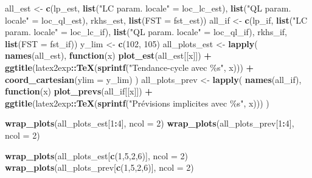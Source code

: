 \documentclass[
  12pt,
  a4paper,french]{article}
\newenvironment{Shaded}{\begin{snugshade}}{\end{snugshade}}
\newcommand{\AttributeTok}[1]{\textcolor[rgb]{0.13,0.29,0.53}{#1}}
\newcommand{\ControlFlowTok}[1]{\textcolor[rgb]{0.13,0.29,0.53}{\textbf{#1}}}
\newcommand{\DecValTok}[1]{\textcolor[rgb]{0.00,0.00,0.81}{#1}}
\newcommand{\FunctionTok}[1]{\textcolor[rgb]{0.13,0.29,0.53}{\textbf{#1}}}
\newcommand{\NormalTok}[1]{#1}
\newcommand{\OtherTok}[1]{\textcolor[rgb]{0.56,0.35,0.01}{#1}}
\newcommand{\SpecialCharTok}[1]{\textcolor[rgb]{0.81,0.36,0.00}{\textbf{#1}}}
\newcommand{\StringTok}[1]{\textcolor[rgb]{0.31,0.60,0.02}{#1}}
\newcommand\1{\mathds{1}}
\begin{document}
\begin{Shaded}
\begin{Highlighting}[]
\NormalTok{all\_est }\OtherTok{\textless{}{-}} \FunctionTok{c}\NormalTok{(lp\_est, }\FunctionTok{list}\NormalTok{(}\StringTok{"LC param. locale"} \OtherTok{=}\NormalTok{ loc\_lc\_est),}
             \FunctionTok{list}\NormalTok{(}\StringTok{"QL param. locale"} \OtherTok{=}\NormalTok{ loc\_ql\_est), }
\NormalTok{             rkhs\_est,}
             \FunctionTok{list}\NormalTok{(}\AttributeTok{FST =}\NormalTok{ fst\_est))}
\NormalTok{all\_if }\OtherTok{\textless{}{-}} \FunctionTok{c}\NormalTok{(lp\_if, }\FunctionTok{list}\NormalTok{(}\StringTok{"LC param. locale"} \OtherTok{=}\NormalTok{ loc\_lc\_if),}
            \FunctionTok{list}\NormalTok{(}\StringTok{"QL param. locale"} \OtherTok{=}\NormalTok{ loc\_ql\_if), }
\NormalTok{            rkhs\_if,}
            \FunctionTok{list}\NormalTok{(}\AttributeTok{FST =}\NormalTok{ fst\_if))}
\NormalTok{y\_lim }\OtherTok{\textless{}{-}} \FunctionTok{c}\NormalTok{(}\DecValTok{102}\NormalTok{, }\DecValTok{105}\NormalTok{)}
\NormalTok{all\_plots\_est }\OtherTok{\textless{}{-}} \FunctionTok{lapply}\NormalTok{(}
  \FunctionTok{names}\NormalTok{(all\_est), }
  \ControlFlowTok{function}\NormalTok{(x) }\FunctionTok{plot\_est}\NormalTok{(all\_est[[x]]) }\SpecialCharTok{+} 
    \FunctionTok{ggtitle}\NormalTok{(latex2exp}\SpecialCharTok{::}\FunctionTok{TeX}\NormalTok{(}\FunctionTok{sprintf}\NormalTok{(}\StringTok{"Tendance{-}cycle avec \%s"}\NormalTok{, x))) }\SpecialCharTok{+}
    \FunctionTok{coord\_cartesian}\NormalTok{(}\AttributeTok{ylim =}\NormalTok{ y\_lim)}
\NormalTok{)}
\NormalTok{all\_plots\_prev }\OtherTok{\textless{}{-}} \FunctionTok{lapply}\NormalTok{(}
  \FunctionTok{names}\NormalTok{(all\_if), }
  \ControlFlowTok{function}\NormalTok{(x) }\FunctionTok{plot\_prevs}\NormalTok{(all\_if[[x]]) }\SpecialCharTok{+} 
    \FunctionTok{ggtitle}\NormalTok{(latex2exp}\SpecialCharTok{::}\FunctionTok{TeX}\NormalTok{(}\FunctionTok{sprintf}\NormalTok{(}\StringTok{"Prévisions implicites avec \%s"}\NormalTok{, x)))}
\NormalTok{)}

\FunctionTok{wrap\_plots}\NormalTok{(all\_plots\_est[}\DecValTok{1}\SpecialCharTok{:}\DecValTok{4}\NormalTok{], }\AttributeTok{ncol =} \DecValTok{2}\NormalTok{)}
\FunctionTok{wrap\_plots}\NormalTok{(all\_plots\_prev[}\DecValTok{1}\SpecialCharTok{:}\DecValTok{4}\NormalTok{], }\AttributeTok{ncol =} \DecValTok{2}\NormalTok{)}

\FunctionTok{wrap\_plots}\NormalTok{(all\_plots\_est[}\FunctionTok{c}\NormalTok{(}\DecValTok{1}\NormalTok{,}\DecValTok{5}\NormalTok{,}\DecValTok{2}\NormalTok{,}\DecValTok{6}\NormalTok{)], }\AttributeTok{ncol =} \DecValTok{2}\NormalTok{)}
\FunctionTok{wrap\_plots}\NormalTok{(all\_plots\_prev[}\FunctionTok{c}\NormalTok{(}\DecValTok{1}\NormalTok{,}\DecValTok{5}\NormalTok{,}\DecValTok{2}\NormalTok{,}\DecValTok{6}\NormalTok{)], }\AttributeTok{ncol =} \DecValTok{2}\NormalTok{)}


\end{Highlighting}
\end{Shaded}
\end{document}
